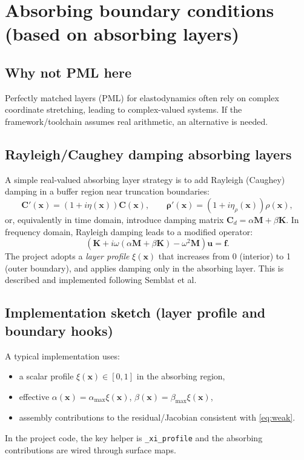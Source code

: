 \documentclass[11pt,a4paper]{report}
\begin{document}
\chapter{Absorbing boundary conditions (based on absorbing layers)}
\section{Why not PML here}
Perfectly matched layers (PML) for elastodynamics often rely on complex coordinate stretching,
leading to complex-valued systems. If the framework/toolchain assumes real arithmetic, an alternative is needed.

\section{Rayleigh/Caughey damping absorbing layers}
A simple real-valued absorbing layer strategy is to add Rayleigh (Caughey) damping in a buffer region near truncation boundaries:
\begin{equation}
\bm C'(\bm x) = (1+i\eta(\bm x)) \bm C(\bm x), \qquad
\bm \rho'(\bm x) = (1+i\eta_\rho(\bm x)) \rho(\bm x),
\end{equation}
or, equivalently in time domain, introduce damping matrix $\bm C_d = \alpha \bm M + \beta \bm K$.
In frequency domain, Rayleigh damping leads to a modified operator:
\begin{equation}
\left( \bm K + i\omega(\alpha \bm M + \beta \bm K) - \omega^2 \bm M \right)\bm u = \bm f.
\end{equation}
The project adopts a \emph{layer profile} $\xi(\bm x)$ that increases from 0 (interior) to 1 (outer boundary),
and applies damping only in the absorbing layer. This is described and implemented following Semblat et al.

\section{Implementation sketch (layer profile and boundary hooks)}
A typical implementation uses:
\begin{itemize}
\item a scalar profile $\xi(\bm x)\in[0,1]$ in the absorbing region,
\item effective $\alpha(\bm x)=\alpha_{\max}\xi(\bm x)$, $\beta(\bm x)=\beta_{\max}\xi(\bm x)$,
\item assembly contributions to the residual/Jacobian consistent with \cref{eq:weak}.
\end{itemize}
In the project code, the key helper is \texttt{\_xi\_profile} and the absorbing contributions are wired through surface maps.
\end{document}
